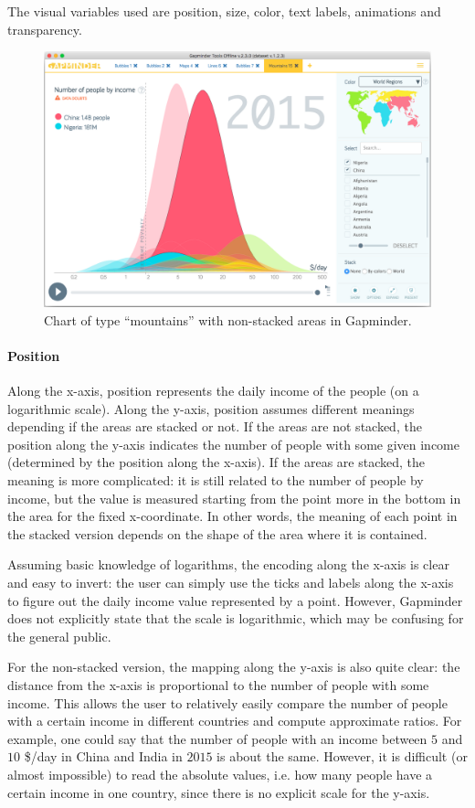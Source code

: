 The visual variables used are position, size, color, text labels, animations and transparency.

\begin{figure}[h]
	\centering
	\includegraphics[width=0.95\columnwidth]{figures/mountains-non-stacked}
	\caption{Chart of type ``mountains'' with non-stacked areas in Gapminder.}
	\label{fig:mountains-non-stacked}
\end{figure}

\paragraph{Position}
Along the x-axis, position represents the daily income of the people (on a logarithmic scale).
Along the y-axis, position assumes different meanings depending if the areas are stacked or not.
If the areas are not stacked, the position along the y-axis indicates the number of people with some given income (determined by the position along the x-axis).
If the areas are stacked, the meaning is more complicated:
it is still related to the number of people by income, but the value is measured starting from the point more in the bottom in the area for the fixed x-coordinate.
In other words, the meaning of each point in the stacked version depends on the shape of the area where it is contained.

Assuming basic knowledge of logarithms, the encoding along the x-axis is clear and easy to invert:
the user can simply use the ticks and labels along the x-axis to figure out the daily income value represented by a point.
However, Gapminder does not explicitly state that the scale is logarithmic, which may be confusing for the general public.

For the non-stacked version, the mapping along the y-axis is also quite clear:
the distance from the x-axis is proportional to the number of people with some income.
This allows the user to relatively easily compare the number of people with a certain income in different countries and compute approximate ratios.
For example, one could say that the number of people with an income between $5$ and $10$ \$/day in China and India in $2015$ is about the same.
However, it is difficult (or almost impossible) to read the absolute values, i.e. how many people have a certain income in one country, since there is no explicit scale for the y-axis.

